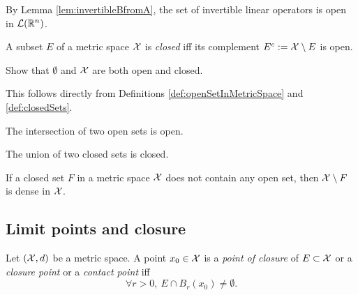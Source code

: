 \begin{exm}
  \label{exm:invertibleOpSetIsOpen}
  By Lemma \ref{lem:invertibleBfromA},
  the set of invertible linear operators is open
  in ${\cal L}(\mathbb{R}^n)$.
\end{exm}

\begin{defn}
  \label{def:closedSets}
  A subset $E$ of a metric space ${\cal X}$ is \emph{closed}
  iff its complement $E^c:={\cal X}\setminus E$ is open.
\end{defn}

\begin{exc}
  Show that $\emptyset$ and ${\cal X}$
  are both open and closed.
\end{exc}
\begin{solution}
  This follows directly from
  Definitions \ref{def:openSetInMetricSpace} and \ref{def:closedSets}.
\end{solution}

\begin{lem}
  \label{lem:intersectionOpenSets}
  The intersection of two open sets is open.
\end{lem}

\begin{lem}
  \label{lem:unionClosedSets}
  The union of two closed sets is closed.
\end{lem}

\begin{exc}
  \label{exc:meagerSetComplementIsDense}
  If a closed set $F$ in a metric space ${\cal X}$
  does not contain any open set,
  then ${\cal X}\setminus F$ is dense in ${\cal X}$.
\end{exc}

\subsection{Limit points and closure}
\label{sec:limit-points-conv}

\begin{defn}
  \label{def:closurePointInMetricSpace}
  Let $({\cal X},d)$ be a metric space.
  A point $x_0\in {\cal X}$ is %
  a \emph{point of closure} of $E\subset {\cal X}$
  or a \emph{closure point} or a \emph{contact point}
  iff
  \begin{equation}
    \label{eq:closurePoint}
    \forall r>0, \ E\cap B_r(x_0) \ne \emptyset.
  \end{equation}
\end{defn}


